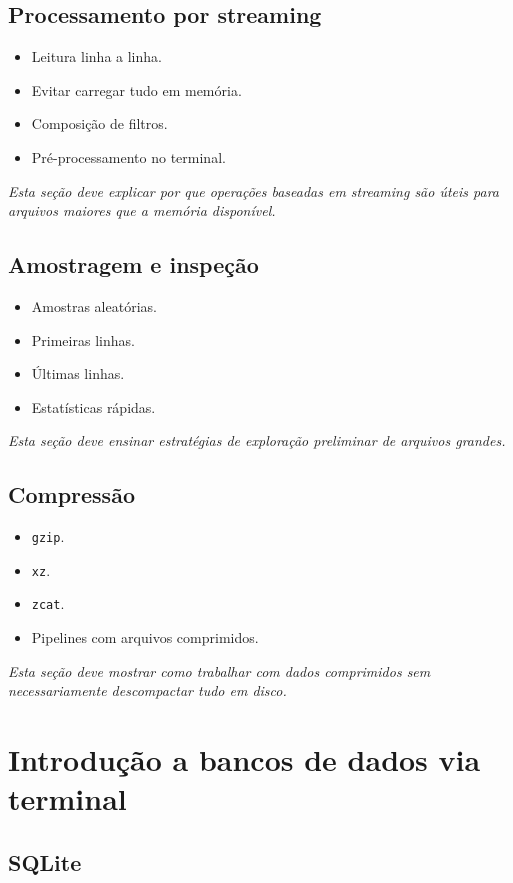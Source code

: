 \documentclass[12pt,openany]{book}
\newcommand{\placeholder}[1]{
    \par\medskip
    \noindent\textit{#1}
    \par\medskip
}
\newcommand{\topicos}[1]{
    \begin{itemize}
        #1
    \end{itemize}
}
\begin{document}
\begin{refsection}
\section{Processamento por streaming}

\topicos{
    \item Leitura linha a linha.
    \item Evitar carregar tudo em memória.
    \item Composição de filtros.
    \item Pré-processamento no terminal.
}

\placeholder{Esta seção deve explicar por que operações baseadas em streaming são úteis para arquivos maiores que a memória disponível.}

\section{Amostragem e inspeção}

\topicos{
    \item Amostras aleatórias.
    \item Primeiras linhas.
    \item Últimas linhas.
    \item Estatísticas rápidas.
}

\placeholder{Esta seção deve ensinar estratégias de exploração preliminar de arquivos grandes.}

\section{Compressão}

\topicos{
    \item \texttt{gzip}.
    \item \texttt{xz}.
    \item \texttt{zcat}.
    \item Pipelines com arquivos comprimidos.
}

\placeholder{Esta seção deve mostrar como trabalhar com dados comprimidos sem necessariamente descompactar tudo em disco.}

\chapter{Introdução a bancos de dados via terminal}

\section{SQLite}


\end{refsection}
\end{document}
